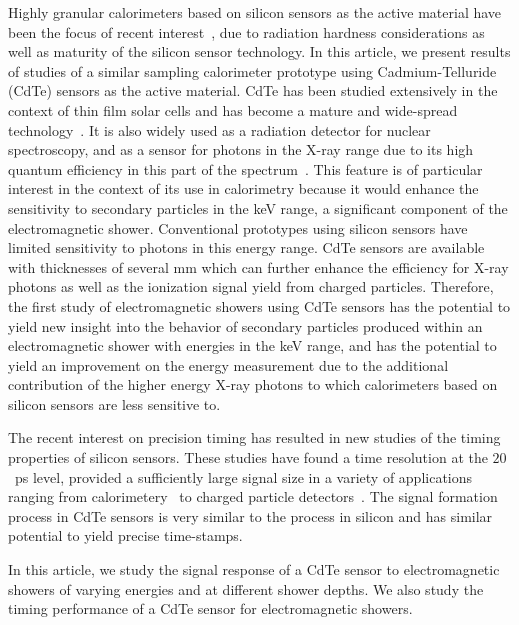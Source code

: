 Highly granular calorimeters based on silicon sensors as the active material 
have been the focus of recent interest~\cite{Adloff:2009,Butler:2020886}, due to
radiation hardness considerations as well as maturity of the silicon sensor
technology. In this article, we present results of studies of a similar
sampling calorimeter prototype using Cadmium-Telluride (CdTe) sensors as the 
active material. CdTe has been studied extensively in the context
of thin film solar cells and has become a mature and wide-spread
technology~\cite{cdtegeneric}. It is also widely used as a radiation
detector for nuclear spectroscopy, and as a sensor for photons in the X-ray range 
due to its high quantum efficiency in this part of the 
spectrum~\cite{cdtesensorsgeneric,cdtesensors1,cdtesensors2,cdtesensors3}.
This feature is of particular interest in the context of its use
in calorimetry because it would enhance the sensitivity to secondary particles in the keV range, 
a significant component of the electromagnetic shower. Conventional prototypes 
using silicon sensors have limited sensitivity to photons in this energy range. 
CdTe sensors are available with thicknesses of several mm which can further enhance the 
efficiency for X-ray photons as well as the ionization signal yield from charged particles.
Therefore, the first study of electromagnetic
showers using CdTe sensors has the potential to yield new insight
into the behavior of secondary particles produced within an 
electromagnetic shower with energies in the keV range, and has the potential
to yield an improvement on the energy measurement due to
the additional contribution of the higher energy X-ray photons to which 
calorimeters based on silicon sensors are less sensitive to.

The recent interest on precision timing has resulted in new studies of 
the timing properties of silicon sensors. 
These studies have found a time resolution 
at the $20$~ps level, provided a sufficiently large signal size
in a variety of applications ranging from calorimetery~\cite{SiliconTiming} to 
charged particle detectors~\cite{santacruz}. The signal formation process
in CdTe sensors is very similar to the process in silicon and has 
similar potential to yield precise time-stamps.

In this article, we study the signal response of a CdTe sensor to electromagnetic
showers of varying energies and at different shower depths. We also study the timing
performance of a CdTe sensor for electromagnetic showers.

